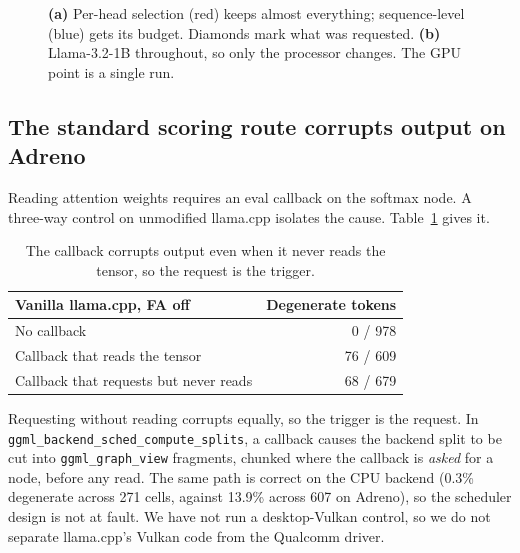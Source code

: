 \documentclass[11pt]{article}
\begin{document}
\begin{figure}[h]
\caption{\textbf{(a)} Per-head selection (red) keeps almost everything; sequence-level (blue)
gets its budget. Diamonds mark what was requested. \textbf{(b)} Llama-3.2-1B throughout, so
only the processor changes. The GPU point is a single run.}
\label{fig:findings}
\end{figure}

\subsection{The standard scoring route corrupts output on Adreno}
Reading attention weights requires an eval callback on the softmax node. A three-way control
on unmodified llama.cpp isolates the cause. Table~\ref{tab:control} gives it.

\begin{table}[h]\centering\small
\caption{The callback corrupts output even when it never reads the tensor, so the request is the trigger.}
\label{tab:control}
\begin{tabular}{@{}lr@{}}
\toprule
\textbf{Vanilla llama.cpp, FA off} & \textbf{Degenerate tokens}\\
\midrule
No callback & 0 / 978\\
Callback that reads the tensor & 76 / 609\\
\rowcolor{cA!8} Callback that requests but never reads & 68 / 679\\
\bottomrule
\end{tabular}
\end{table}

\noindent Requesting without reading corrupts equally, so the trigger is the request. In
\texttt{ggml\_backend\_}\allowbreak\texttt{sched\_compute\_splits}, a callback causes the backend split to be cut
into \texttt{ggml\_graph\_view} fragments, chunked where the callback is \emph{asked} for a
node, before any read. The same path is correct on the CPU backend (0.3\% degenerate across
271 cells, against 13.9\% across 607 on Adreno), so the scheduler design is not at fault. We
have not run a desktop-Vulkan control, so we do not separate llama.cpp's Vulkan code from the
Qualcomm driver.
\end{document}
